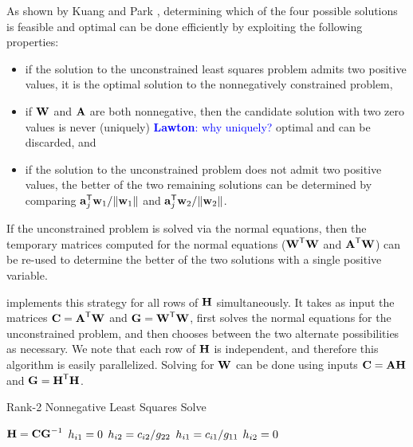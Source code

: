 \documentclass[conference,compsoc]{IEEEtran}
\newcommand{\LM}[1]{\textcolor{blue}{\textbf{Lawton}: #1}}
\begin{document}
As shown by Kuang and Park \cite{KP13}, determining which of the four possible solutions is feasible and optimal can be done efficiently by exploiting the following properties:
\begin{itemize}
	\item if the solution to the unconstrained least squares problem admits two positive values, it is the optimal solution to the nonnegatively constrained problem,
	\item if $\M{W}$ and $\M{A}$ are both nonnegative, then the candidate solution with two zero values is never (uniquely) \LM{why uniquely?} optimal and can be discarded, and
	\item if the solution to the unconstrained problem does not admit two positive values, the better of the two remaining solutions can be determined by comparing $\V{a}_{j}^\Tra\V{w}_1 / \|\V{w}_1\|$ and $\V{a}_{j}^\Tra\V{w}_2 / \|\V{w}_2\|$.
\end{itemize}
If the unconstrained problem is solved via the normal equations, then the temporary matrices computed for the normal equations ($\M{W}^\Tra\M{W}$ and $\M{A}^\Tra\M{W}$) can be re-used to determine the better of the two solutions with a single positive variable.

 implements this strategy for all rows of $\M{H}$ simultaneously.
It takes as input the matrices $\M{C}=\M{A}^\Tra\M{W}$ and $\M{G}=\M{W}^\Tra\M{W}$, first solves the normal equations for the unconstrained problem, and then chooses between the two alternate possibilities as necessary.
We note that each row of $\M{H}$ is independent, and therefore this algorithm is easily parallelized.
Solving for $\M{W}$ can be done using inputs $\M{C}=\M{A}\M{H}$ and $\M{G}=\M{H}^\Tra\M{H}$.

\begin{algorithm}
\caption{Rank-2 Nonnegative Least Squares Solve \cite{KP13}}
\label{alg:r2nnls}
\begin{algorithmic}[1]
		\State $\M{H} = \M{C}\M{G}^{-1}$ \hfill {}
				\State {}
					\State $\ME{H}{i1} = 0$
					\State $\ME{H}{i2} = \ME{C}{i2} / \ME{G}{22}$
				\Else
					\State $\ME{H}{i1} = \ME{C}{i1} / \ME{G}{11}$
					\State $\ME{H}{i2} = 0$
				\EndIf
			\EndIf
		\EndFor
	\EndFunction
\end{algorithmic}
\end{algorithm}
\end{document}
